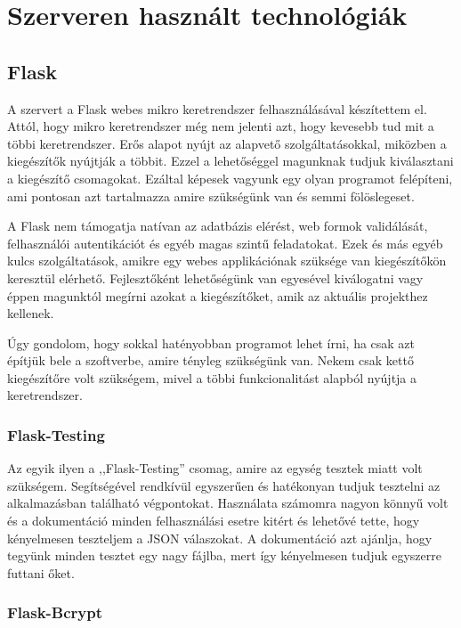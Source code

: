 \documentclass{thesis-ekf}
\theoremstyle{definition}
\theoremstyle{remark}
\begin{document}
\newpage

\section{Szerveren használt technológiák}\label{szerveren_hasznalt_technologiak}

\subsection{Flask}

A szervert a Flask webes mikro keretrendszer felhasználásával készítettem el.
Attól, hogy mikro keretrendszer még nem jelenti azt, hogy kevesebb tud mit a többi keretrendszer.
Erős alapot nyújt az alapvető szolgáltatásokkal, miközben a kiegészítők nyújtják a többit.
Ezzel a lehetőséggel magunknak tudjuk kiválasztani a kiegészítő csomagokat.
Ezáltal képesek vagyunk egy olyan programot felépíteni, ami pontosan azt tartalmazza amire szükségünk van és semmi fölöslegeset.

A Flask nem támogatja natívan az adatbázis elérést, web formok validálását, felhasználói autentikációt és egyéb magas szintű feladatokat.
Ezek és más egyéb kulcs szolgáltatások, amikre egy webes applikációnak szüksége van kiegészítőkön keresztül elérhető.
Fejlesztőként lehetőségünk van egyesével kiválogatni vagy éppen magunktól megírni azokat a kiegészítőket, amik az aktuális projekthez kellenek.
\cite{flask}

Úgy gondolom, hogy sokkal hatényobban programot lehet írni, ha csak azt építjük bele a szoftverbe, amire tényleg szükségünk van.
Nekem csak kettő kiegészítőre volt szükségem, mivel a többi funkcionalitást alapból nyújtja a keretrendszer.

\subsubsection{Flask-Testing}

Az egyik ilyen a ,,Flask-Testing'' csomag, amire az egység tesztek miatt volt szükségem.
Segítségével rendkívül egyszerűen és hatékonyan tudjuk tesztelni az alkalmazásban található végpontokat.
Használata számomra nagyon könnyű volt és a dokumentáció minden felhasználási esetre kitért és lehetővé tette, hogy kényelmesen teszteljem a JSON válaszokat.
A dokumentáció azt ajánlja, hogy tegyünk minden tesztet egy nagy fájlba, mert így kényelmesen tudjuk egyszerre futtani őket.

\subsubsection{Flask-Bcrypt}
\end{document}
